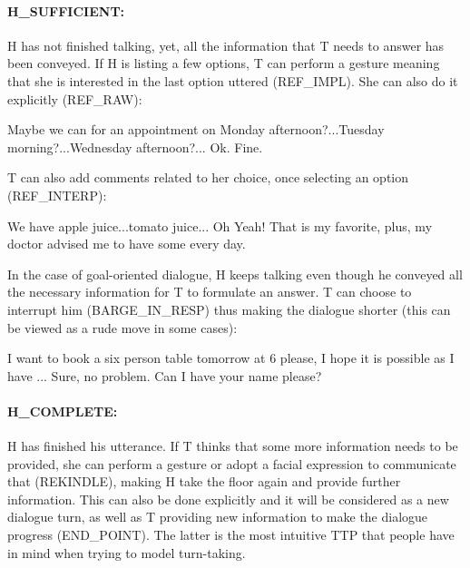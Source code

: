                    	\paragraph{H\_SUFFICIENT:} H has not finished talking, yet, all the information that T needs to answer has been conveyed. If H is listing a few options, T can perform a gesture meaning that she is interested in the last option uttered (REF\_IMPL). She can also do it explicitly (REF\_RAW):
                    
                    	\begin{dialogue}
							 Maybe we can for an appointment on Monday afternoon?...Tuesday morning?...Wednesday afternoon?...
							 Ok. Fine.
						\end{dialogue}
                        
                   	T can also add comments related to her choice, once selecting an option (REF\_INTERP):
                    
                    	\begin{dialogue}
							 We have apple juice...tomato juice...
							 Oh Yeah! That is my favorite, plus, my doctor advised me to have some every day.
						\end{dialogue}
                    
                    In the case of goal-oriented dialogue, H keeps talking even though he conveyed all the necessary information for T to formulate an answer. T can choose to interrupt him (BARGE\_IN\_RESP) thus making the dialogue shorter (this can be viewed as a rude move in some cases):
                    
                 		\begin{dialogue}
							 I want to book a six person table tomorrow at 6 please, I hope it is possible as I have ...
							 Sure, no problem. Can I have your name please?
						\end{dialogue}
                        
                  	\paragraph{H\_COMPLETE:} H has finished his utterance. If T thinks that some more information needs to be provided, she can perform a gesture or adopt a facial expression to communicate that (REKINDLE), making H take the floor again and provide further information. This can also be done explicitly and it will be considered as a new dialogue turn, as well as T providing new information to make the dialogue progress (END_POINT). The latter is the most intuitive TTP that people have in mind when trying to model turn-taking.
                    
